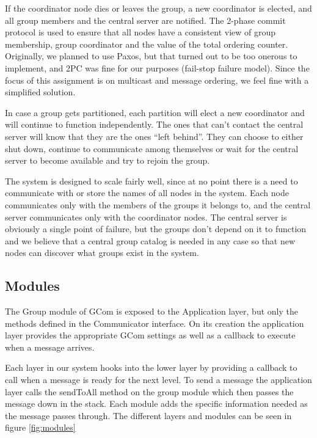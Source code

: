\documentclass[10pt, oneside]{article}
\begin{document}
If the coordinator node dies or leaves the group, a new coordinator is elected,
and all group members and the central server are notified. The 2-phase commit
protocol is used to ensure that all nodes have a consistent view of group
membership, group coordinator and the value of the total ordering
counter. Originally, we planned to use Paxos, but that turned out to be too
onerous to implement, and 2PC was fine for our purposes (fail-stop failure
model). Since the focus of this assignment is on multicast and message ordering,
we feel fine with a simplified solution.

In case a group gets partitioned, each partition will elect a new coordinator
and will continue to function independently. The ones that can't contact the
central server will know that they are the ones ``left behind''. They can choose
to either shut down, continue to communicate among themselves or wait for the
central server to become available and try to rejoin the group.

The system is designed to scale fairly well, since at no point there is a need
to communicate with or store the names of all nodes in the system. Each node
communicates only with the members of the groups it belongs to, and the central
server communicates only with the coordinator nodes. The central server is
obviously a single point of failure, but the groups don't depend on it to
function and we believe that a central group catalog is needed in any case so
that new nodes can discover what groups exist in the system.
\pagebreak
\subsection{Modules}
The Group module of GCom is exposed to the Application layer, but only the 
methods defined in the Communicator interface. On its creation the application
layer provides the appropriate GCom settings as well as a callback to execute
when a message arrives. 

Each layer in our system hooks into the lower layer by providing a callback 
to call when a message is ready for the next level. To send a message the 
application layer calls the sendToAll method on the group module which then 
passes the message down in the stack. Each module adds the specific information 
needed as the message passes through. The different layers and modules can 
be seen in figure \ref{fig:modules}
\end{document}
